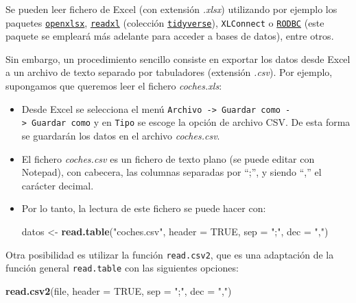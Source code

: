 \documentclass[]{book}
\newenvironment{Shaded}{\begin{snugshade}}{\end{snugshade}}
\newcommand{\KeywordTok}[1]{\textcolor[rgb]{0.13,0.29,0.53}{\textbf{#1}}}
\newcommand{\DataTypeTok}[1]{\textcolor[rgb]{0.13,0.29,0.53}{#1}}
\newcommand{\StringTok}[1]{\textcolor[rgb]{0.31,0.60,0.02}{#1}}
\newcommand{\OtherTok}[1]{\textcolor[rgb]{0.56,0.35,0.01}{#1}}
\newcommand{\NormalTok}[1]{#1}
\begin{document}
Se pueden leer fichero de Excel (con extensión \emph{.xlsx}) utilizando
por ejemplo los paquetes
\href{https://cran.r-project.org/web/packages/openxlsx/index.html}{\texttt{openxlsx}},
\href{https://readxl.tidyverse.org}{\texttt{readxl}} (colección
\href{https://www.tidyverse.org/}{\texttt{tidyverse}}),
\texttt{XLConnect} o
\href{https://cran.r-project.org/web/packages/RODBC/index.html}{\texttt{RODBC}}
(este paquete se empleará más adelante para acceder a bases de datos),
entre otros.

Sin embargo, un procedimiento sencillo consiste en exportar los datos
desde Excel a un archivo de texto separado por tabuladores (extensión
\emph{.csv}). Por ejemplo, supongamos que queremos leer el fichero
\emph{coches.xls}:

\begin{itemize}
\item
  Desde Excel se selecciona el menú
  \texttt{Archivo\ -\textgreater{}\ Guardar\ como\ -\textgreater{}\ Guardar\ como}
  y en \texttt{Tipo} se escoge la opción de archivo CSV. De esta forma
  se guardarán los datos en el archivo \emph{coches.csv}.
\item
  El fichero \emph{coches.csv} es un fichero de texto plano (se puede
  editar con Notepad), con cabecera, las columnas separadas por ``;'', y
  siendo ``,'' el carácter decimal.
\item
  Por lo tanto, la lectura de este fichero se puede hacer con:

\begin{Shaded}
\begin{Highlighting}[]
\NormalTok{datos <-}\StringTok{ }\KeywordTok{read.table}\NormalTok{(}\StringTok{"coches.csv"}\NormalTok{, }\DataTypeTok{header =} \OtherTok{TRUE}\NormalTok{, }\DataTypeTok{sep =} \StringTok{";"}\NormalTok{, }\DataTypeTok{dec =} \StringTok{","}\NormalTok{)}
\end{Highlighting}
\end{Shaded}
\end{itemize}

Otra posibilidad es utilizar la función \texttt{read.csv2}, que es una
adaptación de la función general \texttt{read.table} con las siguientes
opciones:

\begin{Shaded}
\begin{Highlighting}[]
\KeywordTok{read.csv2}\NormalTok{(file, }\DataTypeTok{header =} \OtherTok{TRUE}\NormalTok{, }\DataTypeTok{sep =} \StringTok{";"}\NormalTok{, }\DataTypeTok{dec =} \StringTok{","}\NormalTok{)}
\end{Highlighting}
\end{Shaded}
\end{document}
